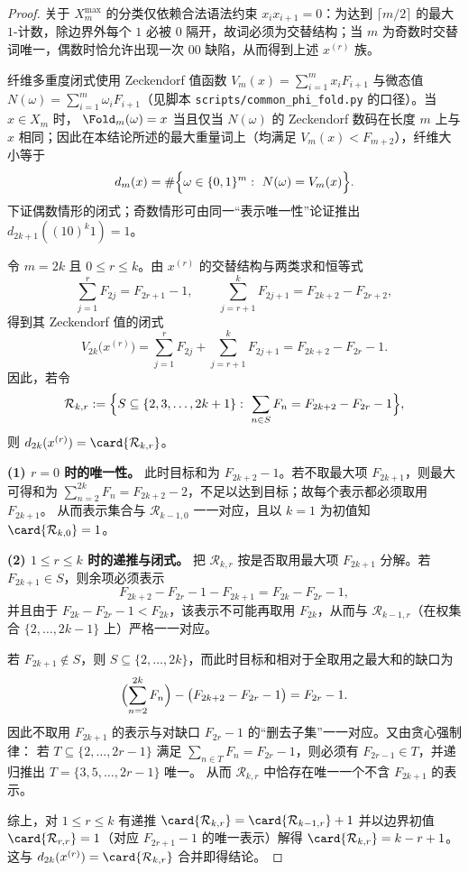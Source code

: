 \begin{proof}
关于 \(X_m^{\max}\) 的分类仅依赖合法语法约束 \(x_ix_{i+1}=0\)：为达到 \(\lceil m/2\rceil\) 的最大 \(1\)-计数，除边界外每个 \(1\) 必被 \(0\) 隔开，故词必须为交替结构；当 \(m\) 为奇数时交替词唯一，偶数时恰允许出现一次 \(00\) 缺陷，从而得到上述 \(x^{(r)}\) 族。
\par
纤维多重度闭式使用 Zeckendorf 值函数 \(V_m(x)=\sum_{i=1}^m x_iF_{i+1}\) 与微态值 \(N(\omega)=\sum_{i=1}^m\omega_iF_{i+1}\)（见脚本 \texttt{scripts/common\_phi\_fold.py} 的口径）。当 \(x\in X_m\) 时，
\(\Fold_m(\omega)=x\) 当且仅当 \(N(\omega)\) 的 Zeckendorf 数码在长度 \(m\) 上与 \(x\) 相同；因此在本结论所述的最大重量词上（均满足 \(V_m(x)<F_{m+2}\)），纤维大小等于
\[
d_m(x)=\#\Bigl\{\omega\in\{0,1\}^m:\ N(\omega)=V_m(x)\Bigr\}.
\]
下证偶数情形的闭式；奇数情形可由同一“表示唯一性”论证推出 \(d_{2k+1}((10)^k1)=1\)。
\par
令 \(m=2k\) 且 \(0\le r\le k\)。由 \(x^{(r)}\) 的交替结构与两类求和恒等式
\[
\sum_{j=1}^{r}F_{2j}=F_{2r+1}-1,\qquad
\sum_{j=r+1}^{k}F_{2j+1}=F_{2k+2}-F_{2r+2},
\]
得到其 Zeckendorf 值的闭式
\[
V_{2k}\bigl(x^{(r)}\bigr)=\sum_{j=1}^{r}F_{2j}+\sum_{j=r+1}^{k}F_{2j+1}
=F_{2k+2}-F_{2r}-1.
\]
因此，若令
\[
\mathcal{R}_{k,r}:=\Bigl\{S\subseteq\{2,3,\dots,2k+1\}:\ \sum_{n\in S}F_n=F_{2k+2}-F_{2r}-1\Bigr\},
\]
则 \(d_{2k}(x^{(r)})=\card{\mathcal{R}_{k,r}}\)。
\par
\noindent\textbf{(1) \(r=0\) 时的唯一性。}
此时目标和为 \(F_{2k+2}-1\)。若不取最大项 \(F_{2k+1}\)，则最大可得和为
\(\sum_{n=2}^{2k}F_n=F_{2k+2}-2\)，不足以达到目标；故每个表示都必须取用 \(F_{2k+1}\)。
从而表示集合与 \(\mathcal{R}_{k-1,0}\) 一一对应，且以 \(k=1\) 为初值知 \(\card{\mathcal{R}_{k,0}}=1\)。
\par
\noindent\textbf{(2) \(1\le r\le k\) 时的递推与闭式。}
把 \(\mathcal{R}_{k,r}\) 按是否取用最大项 \(F_{2k+1}\) 分解。若 \(F_{2k+1}\in S\)，则余项必须表示
\[
F_{2k+2}-F_{2r}-1-F_{2k+1}=F_{2k}-F_{2r}-1,
\]
并且由于 \(F_{2k}-F_{2r}-1<F_{2k}\)，该表示不可能再取用 \(F_{2k}\)，从而与 \(\mathcal{R}_{k-1,r}\)（在权集合 \(\{2,\dots,2k-1\}\) 上）严格一一对应。
\par
若 \(F_{2k+1}\notin S\)，则 \(S\subseteq\{2,\dots,2k\}\)，而此时目标和相对于全取用之最大和的缺口为
\[
\Bigl(\sum_{n=2}^{2k}F_n\Bigr)-\bigl(F_{2k+2}-F_{2r}-1\bigr)=F_{2r}-1.
\]
因此不取用 \(F_{2k+1}\) 的表示与对缺口 \(F_{2r}-1\) 的“删去子集”一一对应。又由贪心强制律：
若 \(T\subseteq\{2,\dots,2r-1\}\) 满足 \(\sum_{n\in T}F_n=F_{2r}-1\)，则必须有 \(F_{2r-1}\in T\)，并递归推出
\(
T=\{3,5,\dots,2r-1\}
\) 唯一。
从而 \(\mathcal{R}_{k,r}\) 中恰存在唯一一个不含 \(F_{2k+1}\) 的表示。
\par
综上，对 \(1\le r\le k\) 有递推
\(
\card{\mathcal{R}_{k,r}}=\card{\mathcal{R}_{k-1,r}}+1
\)
并以边界初值 \(\card{\mathcal{R}_{r,r}}=1\)（对应 \(F_{2r+1}-1\) 的唯一表示）解得
\(
\card{\mathcal{R}_{k,r}}=k-r+1
\)。
这与 \(d_{2k}(x^{(r)})=\card{\mathcal{R}_{k,r}}\) 合并即得结论。
\end{proof}

